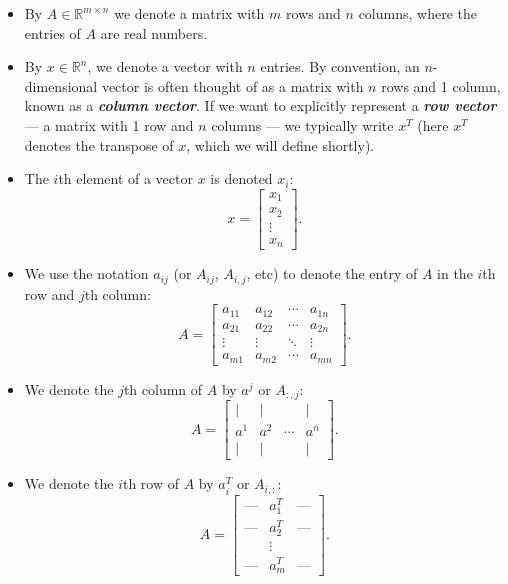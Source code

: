 \documentclass[12pt]{article}
\begin{document}
\begin{itemize}

\item By $A \in \mathbb{R}^{m \times n}$ we denote a matrix with $m$ rows
  and $n$ columns, where the entries of $A$ are real numbers.

\item By $x \in \mathbb{R}^n$, we denote a vector with $n$ entries.
  By convention, an $n$-dimensional vector is often thought of as a
  matrix with $n$ rows and 1 column, known as a \textbf{\textit{column vector}}.  
  If we want to explicitly
  represent a \textbf{\textit{row vector}} --- a matrix with 1 row and
  $n$ columns --- we typically write $x^T$ (here $x^T$ denotes the
  transpose of $x$, which we will define shortly).

\item The $i$th element of a vector $x$ is denoted $x_i$: \[ x = \left
  [ \begin{array}{c} x_1 \\ x_2 \\ \vdots \\ x_n \end{array} \right
  ]. \]

\item We use the notation $a_{ij}$ (or $A_{ij}$,
  $A_{i,j}$, etc) to denote the entry of $A$ in the $i$th row
  and $j$th column: \[A = \left [ \begin{array}{cccc} a_{11} &
  a_{12} & \cdots & a_{1n} \\ a_{21} & a_{22} & \cdots & a_{2n} \\
  \vdots & \vdots & \ddots & \vdots \\ a_{m1} & a_{m2} & \cdots &
  a_{mn} \end{array} \right ].\]

\item We denote the $j$th column of $A$ by $a^j$ or $A_{:,j}$: \[ A =
  \left [ \begin{array}{cccc} | & | &  & 
  | \\ a^1 & a^2 & \cdots & a^n \\ | & | &  & |
  \end{array} \right ]. \]

\item We denote the $i$th row of $A$ by $a^T_i$ or $A_{i,:}$: \[ A = \left
  [ \begin{array}{ccc} \mbox{---} & a^T_1 & 
  \mbox{---} \\   \mbox{---} & a^T_2 &  \mbox{---} \\ & \vdots & \\
  \mbox{---} & a^T_m  &  \mbox{---} \end{array} \right ]. \]


\end{itemize}
\end{document}
